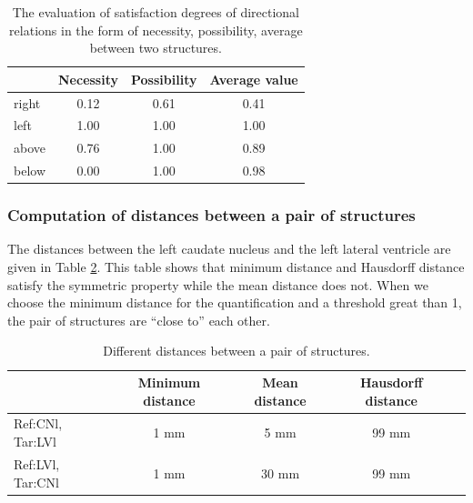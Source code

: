 \documentclass{article}
\begin{document}
\begin{table}[H]
\begin{center}
   \begin{tabular}{| l || c | c | c | }
     \hline
     & Necessity & Possibility & Average value\\ \hline
     right & 0.12 & 0.61 & 0.41 \\ \hline
     left & 1.00 & 1.00 & 1.00 \\ \hline
     above & 0.76 & 1.00 & 0.89 \\ \hline
     below  & 0.00 & 1.00 & 0.98 \\
     \hline
   \end{tabular}
    \caption{ The evaluation of satisfaction degrees of directional relations in the form of necessity, possibility, average between two structures.}\label{tab:direction_lvr_cnr}
     \end{center}
    \end{table}

%  
% 

\subsubsection{Computation of distances between a pair of structures}
The distances between the left caudate nucleus and the left lateral ventricle are given in Table \ref{tab:distance_cdr_lvr}. This table shows that minimum distance and Hausdorff distance satisfy the
symmetric property while the mean distance  does not. When we choose the minimum distance for the quantification and a threshold great than 1, the pair of structures are ``close to'' each other.
\begin{table}[H]
\begin{center}
   \begin{tabular}{| l || c | c | c | c | }
     \hline
     & Minimum distance & Mean distance & Hausdorff distance\\ \hline
     Ref:CNl, Tar:LVl & 1 mm & 5 mm & 99 mm\\ \hline
     Ref:LVl, Tar:CNl & 1 mm & 30 mm & 99 mm\\ \hline
   \end{tabular}
    \caption{ Different distances  between a pair of structures.}\label{tab:distance_cdr_lvr}
     \end{center}
    \end{table}
    
\end{document}

